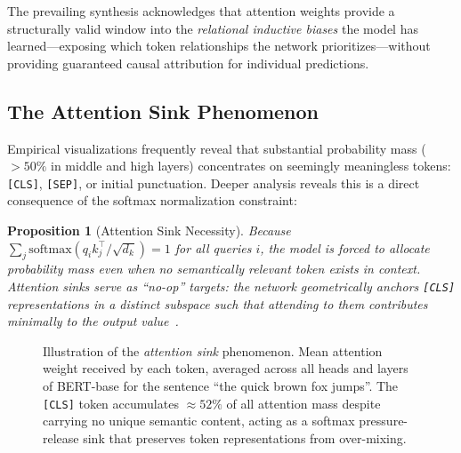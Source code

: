 \documentclass[11pt]{article}
\newtheorem{proposition}[theorem]{Proposition}
\begin{document}
The prevailing synthesis acknowledges that attention weights provide a structurally valid window into the \emph{relational inductive biases} the model has learned—exposing which token relationships the network prioritizes—without providing guaranteed causal attribution for individual predictions.

\subsection{The Attention Sink Phenomenon}

Empirical visualizations frequently reveal that substantial probability mass ($>50\%$ in middle and high layers) concentrates on seemingly meaningless tokens: \texttt{[CLS]}, \texttt{[SEP]}, or initial punctuation. Deeper analysis reveals this is a direct consequence of the softmax normalization constraint:

\begin{proposition}[Attention Sink Necessity]
Because $\sum_j \text{softmax}(q_i k_j^\top / \sqrt{d_k}) = 1$ for all queries $i$, the model is forced to allocate probability mass even when no semantically relevant token exists in context. Attention sinks serve as ``no-op'' targets: the network geometrically anchors \texttt{[CLS]} representations in a distinct subspace such that attending to them contributes minimally to the output value~\cite{sun2024massive}.
\end{proposition}

\begin{figure}[ht]
\centering
{}
\caption{Illustration of the \emph{attention sink} phenomenon. Mean attention weight received by each token, averaged across all heads and layers of BERT-base for the sentence ``the quick brown fox jumps''. The \texttt{[CLS]} token accumulates $\approx52\%$ of all attention mass despite carrying no unique semantic content, acting as a softmax pressure-release sink that preserves token representations from over-mixing.}
\label{fig:attn_sink}
\end{figure}
\end{document}
